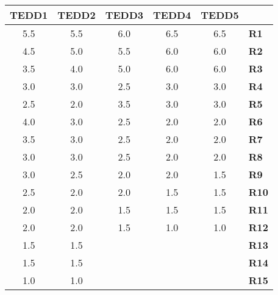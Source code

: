 \begin{table}[tb]
\centering\footnotesize

\begin{tabular}{|c|c|ccc|l}
\cline{1-5}
\textbf{TEDD1} & \textbf{TEDD2} & \multicolumn{1}{c|}{\textbf{TEDD3}} & \multicolumn{1}{c|}{\textbf{TEDD4}} & \textbf{TEDD5} &  \\ \hline
5.5 & 5.5 & \multicolumn{1}{c|}{6.0} & \multicolumn{1}{c|}{6.5} & 6.5 & \multicolumn{1}{l|}{\textbf{R1}} \\ \hline
4.5 & 5.0 & \multicolumn{1}{c|}{5.5} & \multicolumn{1}{c|}{6.0} & 6.0 & \multicolumn{1}{l|}{\textbf{R2}} \\ \hline
3.5 & 4.0 & \multicolumn{1}{c|}{5.0} & \multicolumn{1}{c|}{6.0} & 6.0 & \multicolumn{1}{l|}{\textbf{R3}} \\ \hline
3.0 & 3.0 & \multicolumn{1}{c|}{2.5} & \multicolumn{1}{c|}{3.0} & 3.0 & \multicolumn{1}{l|}{\textbf{R4}} \\ \hline
2.5 & 2.0 & \multicolumn{1}{c|}{3.5} & \multicolumn{1}{c|}{3.0} & 3.0 & \multicolumn{1}{l|}{\textbf{R5}} \\ \hline
4.0 & 3.0 & \multicolumn{1}{c|}{2.5} & \multicolumn{1}{c|}{2.0} & 2.0 & \multicolumn{1}{l|}{\textbf{R6}} \\ \hline
3.5 & 3.0 & \multicolumn{1}{c|}{2.5} & \multicolumn{1}{c|}{2.0} & 2.0 & \multicolumn{1}{l|}{\textbf{R7}} \\ \hline
3.0 & 3.0 & \multicolumn{1}{c|}{2.5} & \multicolumn{1}{c|}{2.0} & 2.0 & \multicolumn{1}{l|}{\textbf{R8}} \\ \hline
3.0 & 2.5 & \multicolumn{1}{c|}{2.0} & \multicolumn{1}{c|}{2.0} & 1.5 & \multicolumn{1}{l|}{\textbf{R9}} \\ \hline
2.5 & 2.0 & \multicolumn{1}{c|}{2.0} & \multicolumn{1}{c|}{1.5} & 1.5 & \multicolumn{1}{l|}{\textbf{R10}} \\ \hline
2.0 & 2.0 & \multicolumn{1}{c|}{1.5} & \multicolumn{1}{c|}{1.5} & 1.5 & \multicolumn{1}{l|}{\textbf{R11}} \\ \hline
2.0 & 2.0 & \multicolumn{1}{c|}{1.5} & \multicolumn{1}{c|}{1.0} & 1.0 & \multicolumn{1}{l|}{\textbf{R12}} \\ \hline
1.5 & 1.5 &  &  &  & \multicolumn{1}{l|}{\textbf{R13}} \\ \cline{1-2} \cline{6-6} 
1.5 & 1.5 &  &  &  & \multicolumn{1}{l|}{\textbf{R14}} \\ \cline{1-2} \cline{6-6} 
1.0 & 1.0 &  &  &  & \multicolumn{1}{l|}{\textbf{R15}} \\ \cline{1-2} \cline{6-6} 
\end{tabular}


\end{table}

